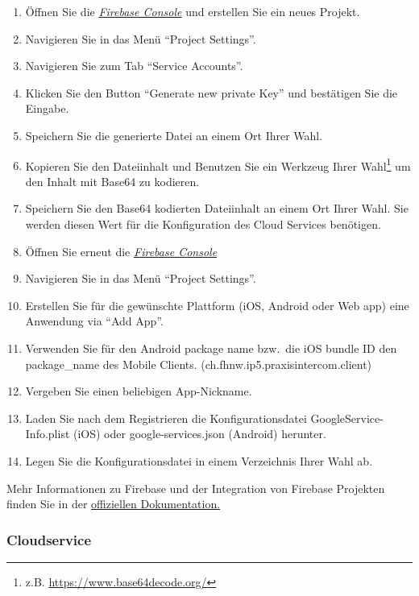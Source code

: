 \begin{enumerate}
    \item Öffnen Sie die \href{https://console.firebase.google.com/}{\textit{Firebase Console}} und erstellen Sie ein neues Projekt.
    \item Navigieren Sie in das Menü ``Project Settings''.
    \item Navigieren Sie zum Tab ``Service Accounts''.
    \item Klicken Sie den Button ``Generate new private Key'' und bestätigen Sie die Eingabe.
    \item Speichern Sie die generierte Datei an einem Ort Ihrer Wahl.
    \item Kopieren Sie den Dateiinhalt und Benutzen Sie ein Werkzeug Ihrer Wahl\footnote{z.B. \url{https://www.base64decode.org/}} um den Inhalt mit Base64 zu kodieren.
    \item Speichern Sie den Base64 kodierten Dateiinhalt an einem Ort Ihrer Wahl. Sie werden diesen Wert für die Konfiguration des Cloud Services benötigen.
    \item Öffnen Sie erneut die \href{https://console.firebase.google.com/}{\textit{Firebase Console}}
    \item Navigieren Sie in das Menü ``Project Settings''.
    \item Erstellen Sie für die gewünschte Plattform (iOS, Android oder Web app) eine Anwendung via ``Add App''.
    \item Verwenden Sie für den Android package name bzw.\ die iOS bundle ID den package\_name des Mobile Clients. (ch.fhnw.ip5.praxisintercom.client)
    \item Vergeben Sie einen beliebigen App-Nickname.
    \item Laden Sie nach dem Registrieren die Konfigurationsdatei GoogleService-Info.plist (iOS) oder google-services.json (Android) herunter.
    \item Legen Sie die Konfigurationsdatei in einem Verzeichnis Ihrer Wahl ab.
\end{enumerate}

Mehr Informationen zu Firebase und der Integration von Firebase Projekten finden Sie in der \href{https://firebase.google.com/docs/projects/learn-more#setting_up_a_firebase_project_and_registering_apps}{offiziellen Dokumentation.}\cite{understand-firebase}

\clearpage

\subsubsection*{Cloudservice}

